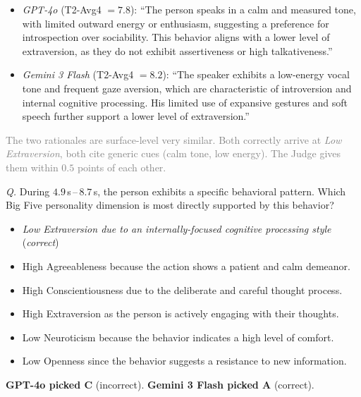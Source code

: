 \documentclass{article}
\begin{document}
\begin{examplebox}[title={Task 2: open-ended reasoning (both models predict Low Extraversion)}]
\begin{itemize}[leftmargin=1.4em, itemsep=2pt, topsep=2pt]
\item \emph{GPT-4o} (T2-Avg4 $=\!7.8$): ``The person speaks in a calm and measured tone, with limited outward energy or enthusiasm, suggesting a preference for introspection over sociability. This behavior aligns with a lower level of extraversion, as they do not exhibit assertiveness or high talkativeness.''
\item \emph{Gemini 3 Flash} (T2-Avg4 $=\!8.2$): ``The speaker exhibits a low-energy vocal tone and frequent gaze aversion, which are characteristic of introversion and internal cognitive processing. His limited use of expansive gestures and soft speech further support a lower level of extraversion.''
\end{itemize}
\textcolor{gray}{The two rationales are surface-level very similar. Both correctly arrive at \emph{Low Extraversion}, both cite generic cues (calm tone, low energy). The Judge gives them within $0.5$ points of each other.}
\end{examplebox}

\begin{examplebox}[title={Task 3: structured cue-grounding probe (same trait, divergent outcome)}]
\emph{Q.} During $4.9$\,s\,--\,$8.7$\,s, the person exhibits a specific behavioral pattern. Which Big Five personality dimension is most directly supported by this behavior?
\begin{itemize}[leftmargin=1.4em, itemsep=0pt, topsep=1pt, parsep=0pt]
\item[A.] \emph{Low Extraversion due to an internally-focused cognitive processing style} \hfill (\emph{correct})
\item[B.] High Agreeableness because the action shows a patient and calm demeanor.
\item[C.] High Conscientiousness due to the deliberate and careful thought process.
\item[D.] High Extraversion as the person is actively engaging with their thoughts.
\item[E.] Low Neuroticism because the behavior indicates a high level of comfort.
\item[F.] Low Openness since the behavior suggests a resistance to new information.
\end{itemize}
\textcolor{openc}{\textbf{GPT-4o picked C}} (incorrect). \quad \textcolor{humanc}{\textbf{Gemini 3 Flash picked A}} (correct).
\end{examplebox}
\end{document}

